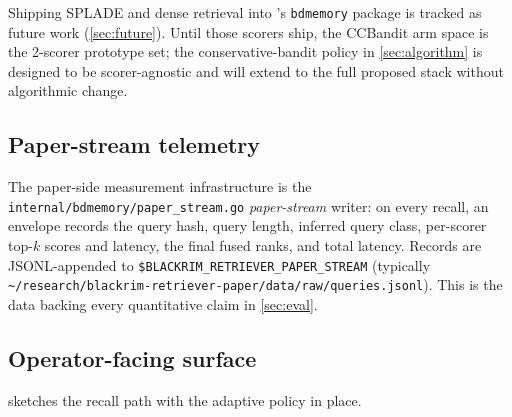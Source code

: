 Shipping SPLADE and dense retrieval into \blackrim's \texttt{bdmemory}
package is tracked as future work (\cref{sec:future}).  Until those
scorers ship, the CCBandit arm space is the 2-scorer prototype set;
the conservative-bandit policy in \cref{sec:algorithm} is designed to
be scorer-agnostic and will extend to the full proposed stack
without algorithmic change.

\subsection{Paper-stream telemetry}
\label{sec:system-telemetry}

The paper-side measurement infrastructure is the
\texttt{internal/bdmemory/paper\_stream.go} \emph{paper-stream} writer:
on every recall, an envelope records the query hash, query length,
inferred query class, per-scorer top-$k$ scores and latency, the final
fused ranks, and total latency. Records are JSONL-appended to
\texttt{\$BLACKRIM\_RETRIEVER\_PAPER\_STREAM} (typically
\texttt{\textasciitilde/research/blackrim-retriever-paper/data/raw/queries.jsonl}).
This is the data backing every quantitative claim in
\cref{sec:eval}.

\subsection{Operator-facing surface}


 sketches the recall path with the
adaptive policy in place.

\begin{figure}[ht]
\centering

\caption{}
\label{fig:retriever-flow}
\end{figure}
